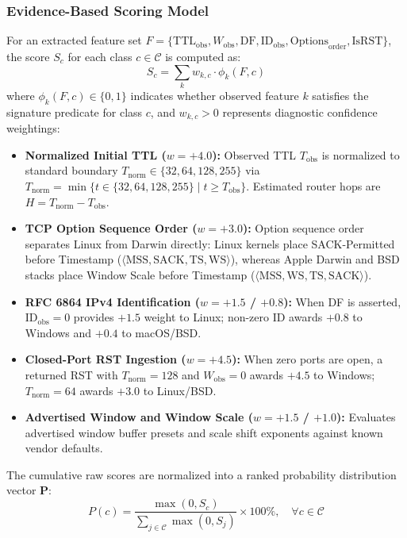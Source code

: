 \documentclass[11pt,a4paper]{article}
\begin{document}
\subsubsection{Evidence-Based Scoring Model}
For an extracted feature set $F = \{\text{TTL}_{\text{obs}}, W_{\text{obs}}, \text{DF}, \text{ID}_{\text{obs}}, \text{Options}_{\text{order}}, \text{IsRST}\}$, the score $S_c$ for each class $c \in \mathcal{C}$ is computed as:
\begin{equation}
S_c = \sum_{k} w_{k,c} \cdot \phi_k(F, c)
\end{equation}
where $\phi_k(F, c) \in \{0, 1\}$ indicates whether observed feature $k$ satisfies the signature predicate for class $c$, and $w_{k,c} > 0$ represents diagnostic confidence weightings:
\begin{itemize}[nosep, leftmargin=1.4em]
    \item \textbf{Normalized Initial TTL ($w = +4.0$):} Observed TTL $T_{\text{obs}}$ is normalized to standard boundary $T_{\text{norm}} \in \{32, 64, 128, 255\}$ via $T_{\text{norm}} = \min \{t \in \{32, 64, 128, 255\} \mid t \ge T_{\text{obs}}\}$. Estimated router hops are $H = T_{\text{norm}} - T_{\text{obs}}$.
    \item \textbf{TCP Option Sequence Order ($w = +3.0$):} Option sequence order separates Linux from Darwin directly: Linux kernels place SACK-Permitted before Timestamp ($\langle\text{MSS}, \text{SACK}, \text{TS}, \text{WS}\rangle$), whereas Apple Darwin and BSD stacks place Window Scale before Timestamp ($\langle\text{MSS}, \text{WS}, \text{TS}, \text{SACK}\rangle$).
    \item \textbf{RFC 6864 IPv4 Identification ($w = +1.5$ / $+0.8$):} When DF is asserted, $\text{ID}_{\text{obs}} = 0$ provides $+1.5$ weight to Linux; non-zero ID awards $+0.8$ to Windows and $+0.4$ to macOS/BSD.
    \item \textbf{Closed-Port RST Ingestion ($w = +4.5$):} When zero ports are open, a returned RST with $T_{\text{norm}} = 128$ and $W_{\text{obs}} = 0$ awards $+4.5$ to Windows; $T_{\text{norm}} = 64$ awards $+3.0$ to Linux/BSD.
    \item \textbf{Advertised Window and Window Scale ($w = +1.5$ / $+1.0$):} Evaluates advertised window buffer presets and scale shift exponents against known vendor defaults.
\end{itemize}

The cumulative raw scores are normalized into a ranked probability distribution vector $\mathbf{P}$:
\begin{equation}
P(c) = \frac{\max(0, S_c)}{\sum_{j \in \mathcal{C}} \max(0, S_j)} \times 100\%, \quad \forall c \in \mathcal{C}
\end{equation}
\end{document}
